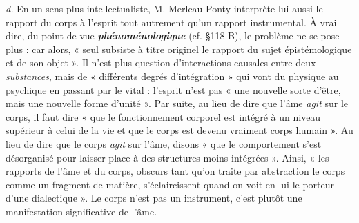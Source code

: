 {\it d.} En un sens plus intellectualiste, M. Merleau-Ponty interprète
lui aussi le rapport du corps à l'esprit tout autrement qu’un rapport
instrumental. À vrai dire, du point de vue \textbf{\textit {phénoménologique}} (cf.
\S 118 B), le problème ne se pose plus : car alors, « seul subsiste à titre
originel le rapport du sujet épistémologique et de son objet ». Il n’est
plus question d’interactions causales entre deux {\it substances}, mais de
« différents degrés d'intégration » qui vont du physique au psychique
en passant par le vital : l’esprit n’est pas « une nouvelle sorte d’être,
mais une nouvelle forme d’unité ». Par suite, au lieu de dire que l’âme
{\it agit} sur le corps, il faut dire « que le fonctionnement corporel est
intégré à un niveau supérieur à celui de la vie et que le corps est
devenu vraiment corps humain ». Au lieu de dire que le corps {\it agit} sur
l’âme, disons « que le comportement s’est désorganisé pour laisser
place à des structures moins intégrées ». Ainsi, « les rapports de l’âme
et du corps, obscurs tant qu’on traite par abstraction le corps comme
un fragment de matière, s’éclaircissent quand on voit en lui le porteur
d’une dialectique ». Le corps n’est pas un instrument, c’est plutôt
une manifestation significative de l’âme.

